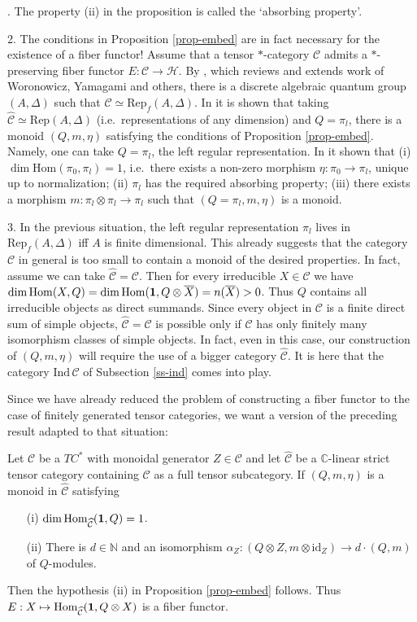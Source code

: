 \documentclass[11pt]{article}
\theoremstyle{definition}
\theoremstyle{definition}
\theoremstyle{remark}
\def\2#1{{\mathcal #1}}
\def\7#1{{\mathbb #1}}
\def\1#1{{\bf #1}}
\def\ol#1{{\overline #1}}
\newcommand{\Hom}{\mathrm{Hom}}
\newcommand{\Rep}{\mathrm{Rep}}
\newcommand{\rarr}{\rightarrow}
\def\id{\mathrm{id}}
\begin{document}
. The property (ii) in the proposition is called the `absorbing property'.

2. The conditions in Proposition \ref{prop-embed} are in fact necessary for the existence of a fiber
functor! Assume that a tensor $*$-category $\2C$ admits a $*$-preserving fiber functor
$E:\2C\rarr\2H$. By \cite{MRT}, which reviews and extends work of Woronowicz, Yamagami and others,
there is a discrete algebraic quantum group $(A,\Delta)$ such that $\2C\simeq\Rep_f(A,\Delta)$. In
\cite{MT} it is shown that taking 
$\widehat{\2C}\simeq\Rep(A,\Delta)$ (i.e.\ representations of any dimension) and $Q=\pi_l$, there is
a monoid $(Q,m,\eta)$ satisfying the conditions of Proposition \ref{prop-embed}. Namely, one can
take $Q=\pi_l$, the left regular representation. In \cite{MT} it shown that (i)
$\dim\Hom(\pi_0,\pi_l)=1$, i.e.\ there exists a non-zero morphism $\eta:\pi_0\rarr\pi_l$, unique  up
to normalization; (ii) $\pi_l$  has the required absorbing property; (iii) there exists a morphism
$m:\pi_l\otimes\pi_l\rarr\pi_l$ such  that $(Q=\pi_l,m,\eta)$ is a monoid.

3. In the previous situation, the left regular representation $\pi_l$ lives in $\Rep_f(A,\Delta)$
iff $A$ is finite dimensional. This already suggests that the category $\2C$ in general is too small
to contain a monoid of the desired properties. In fact, assume we can take $\widehat{\2C}=\2C$. Then
for every irreducible $X\in\2C$ we 
have $\dim\Hom(X,Q)=\dim\Hom(\11,Q\otimes\ol{X})=n(\ol{X})>0$. Thus $Q$ contains all irreducible
objects as direct summands. Since every object in $\2C$ is a finite direct sum of simple objects,
$\widehat{\2C}=\2C$ is possible only if $\2C$ has only finitely many isomorphism classes of simple
objects. In fact, even in this case, our construction of $(Q,m,\eta)$ will require the use of a
bigger category $\widehat{\2C}$. It is here that the category $\mathrm{Ind}\,\2C$ of Subsection
\ref{ss-ind} comes into play.
\erem

Since we have already reduced the problem of constructing a fiber functor to the case of finitely
generated tensor categories, we want a version of the preceding result adapted to that situation:

\bcoro \label{coro-monoid}
Let $\2C$ be a $TC^*$ with monoidal generator $Z\in\2C$ and let $\widehat{\2C}$ be a $\7C$-linear
strict tensor category containing $\2C$ as a full tensor subcategory. If $(Q,m,\eta)$ is a monoid in
$\widehat{\2C}$ satisfying
\begin{itemize}
\item[(i)] $\dim\Hom_{\widehat{\2C}}(\11,Q)=1$.
\item[(ii)] There is $d\in\7N$ and an isomorphism 
$\alpha_Z:(Q\otimes Z,m\otimes\id_Z)\rarr d\cdot(Q,m)$ of $Q$-modules.
\end{itemize}
Then the hypothesis (ii) in Proposition \ref{prop-embed} follows. Thus 
$E: X\mapsto\Hom_{\widehat{\2C}}(\11,Q\otimes X)$ is a fiber functor.
\ecoro
\end{document}
